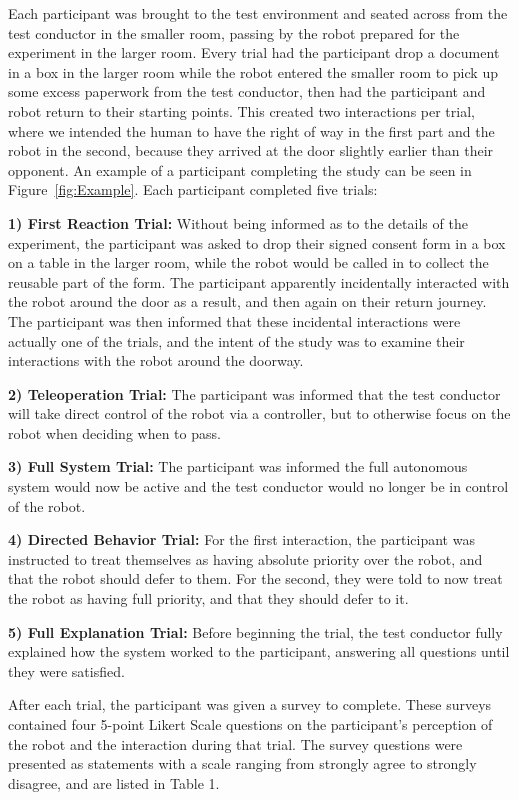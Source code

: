 \documentclass[letterpaper, 10 pt, conference]{ieeeconf}  %
\begin{document}
Each participant was brought to the test environment and seated across from the test conductor in the smaller room, passing by the robot prepared for the experiment in the larger room. Every trial had the participant drop a document in a box in the larger room while the robot entered the smaller room to pick up some excess paperwork from the test conductor, then had the participant and robot return to their starting points. This created two interactions per trial, where we intended the human to have the right of way in the first part and the robot in the second, because they arrived at the door slightly earlier than their opponent. An example of a participant completing the study can be seen in Figure~\ref{fig:Example}. Each participant completed five trials:

\textbf{1) First Reaction Trial:} Without being informed as to the details of the experiment, the participant was asked to drop their signed consent form in a box on a table in the larger room, while the robot would be called in to collect the reusable part of the form. The participant apparently incidentally interacted with the robot around the door as a result, and then again on their return journey. The participant was then informed that these incidental interactions were actually one of the trials, and the intent of the study was to examine their interactions with the robot around the doorway.

\textbf{2) Teleoperation Trial:} The participant was informed that the test conductor will take direct control of the robot via a controller, but to otherwise focus on the robot when deciding when to pass. 

\textbf{3) Full System Trial:} The participant was informed the full autonomous system would now be active and the test conductor would no longer be in control of the robot.

\textbf{4) Directed Behavior Trial:} For the first interaction, the participant was instructed to treat themselves as having absolute priority over the robot, and that the robot should defer to them. For the second, they were told to now treat the robot as having full priority, and that they should defer to it.

\textbf{5) Full Explanation Trial:} Before beginning the trial, the test conductor fully explained how the system worked to the participant, answering all questions until they were satisfied.

After each trial, the participant was given a survey to complete. These surveys contained four 5-point Likert Scale questions on the participant’s perception of the robot and the interaction during that trial. The survey questions were presented as statements with a scale ranging from strongly agree to strongly disagree, and are listed in Table 1.
\end{document}
